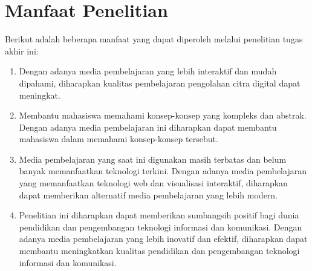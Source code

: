 \section{Manfaat Penelitian}
Berikut adalah beberapa manfaat yang dapat diperoleh melalui penelitian tugas akhir ini:
\begin{enumerate}
    \item Dengan adanya media pembelajaran yang lebih interaktif dan mudah dipahami, diharapkan kualitas pembelajaran pengolahan citra digital dapat meningkat.
    \item Membantu mahasiswa memahami konsep-konsep yang kompleks dan abstrak. Dengan adanya media pembelajaran ini diharapkan dapat membantu mahasiswa dalam memahami konsep-konsep tersebut.
    \item Media pembelajaran yang saat ini digunakan masih terbatas dan belum banyak memanfaatkan teknologi terkini. Dengan adanya media pembelajaran yang memanfaatkan teknologi web dan visualisasi interaktif, diharapkan dapat memberikan alternatif media pembelajaran yang lebih modern.
    \item Penelitian ini diharapkan dapat memberikan sumbangsih positif bagi dunia pendidikan dan pengembangan teknologi informasi dan komunikasi. Dengan adanya media pembelajaran yang lebih inovatif dan efektif, diharapkan dapat membantu meningkatkan kualitas pendidikan dan pengembangan teknologi informasi dan komunikasi.
\end{enumerate}
